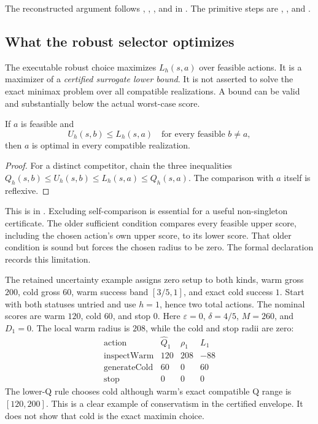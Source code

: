 The reconstructed argument follows ,
, , and
 in . The primitive
steps are , , and
.

\subsection{What the robust selector optimizes}

The executable robust choice maximizes $L_h(s,a)$ over feasible actions. It is
a maximizer of a \emph{certified surrogate lower bound}. It is not asserted to
solve the exact minimax problem over all compatible realizations. A bound can
be valid and substantially below the actual worst-case score.

\begin{proposition}
If $a$ is feasible and
\[
 U_h(s,b)\leq L_h(s,a)\quad
 \text{for every feasible }b\ne a,
\]
then $a$ is optimal in every compatible realization.
\end{proposition}
\begin{proof}
For a distinct competitor, chain the three inequalities
$Q_h(s,b)\leq U_h(s,b)\leq L_h(s,a)\leq Q_h(s,a)$.
The comparison with $a$ itself is reflexive.
\end{proof}

This is  in
. Excluding self-comparison is essential
for a useful non-singleton certificate. The older sufficient condition compares
every feasible upper score, including the chosen action's own upper score, to
its lower score. That older condition is sound but forces the chosen radius to
be zero. The formal declaration
 records this limitation.

\begin{example}
The retained uncertainty example assigns zero setup to both kinds, warm gross
$200$, cold gross $60$, warm success band $[3/5,1]$, and exact cold success $1$.
Start with both statuses untried and use $h=1$, hence two total actions. The
nominal scores are warm $120$, cold $60$, and stop $0$. Here
$\varepsilon=0$, $\delta=4/5$, $M=260$, and $D_1=0$. The local warm radius
is $208$, while the cold and stop radii are zero:
\[
\begin{array}{c|r|r|r}
 \text{action}&\widehat Q_1&\rho_1&L_1\\\hline
 \mathrm{inspectWarm}&120&208&-88\\
 \mathrm{generateCold}&60&0&60\\
 \mathrm{stop}&0&0&0
\end{array}
\]
The lower-Q rule chooses cold although warm's exact compatible Q range is
$[120,200]$. This is a clear example of conservatism in the certified envelope.
It does not show that cold is the exact maximin choice.
\end{example}

